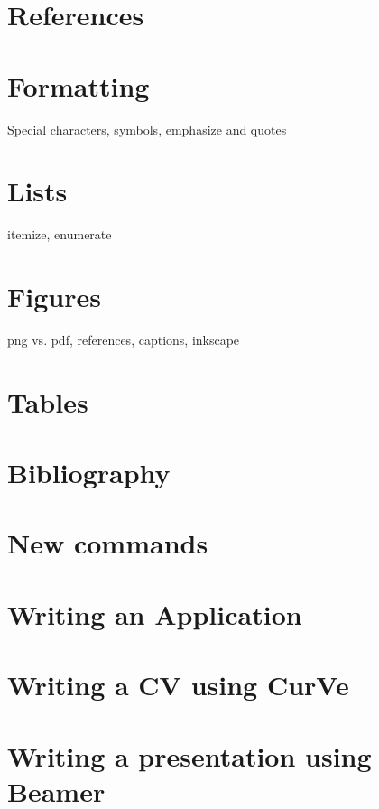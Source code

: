 \section{References}

\section{Formatting}
Special characters, symbols, emphasize and quotes

\section{Lists}
itemize, enumerate

\section{Figures}
png vs. pdf, references, captions, inkscape

\section{Tables}

\section{Bibliography}

\section{New commands}

\section{Writing an Application}

\section{Writing a CV using CurVe}

\section{Writing a presentation using Beamer}